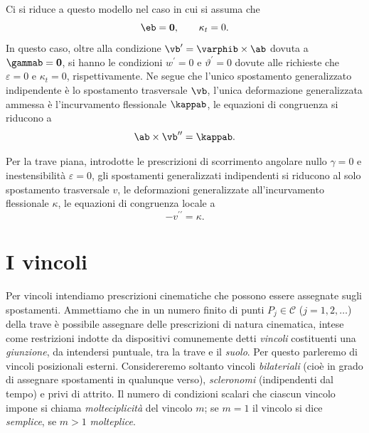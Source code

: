 Ci si riduce a questo modello nel caso in cui si assuma che
\begin{equation}
	\eb=\mathbf{0}, \qquad \kappa_t=0.
\end{equation}
In questo caso, oltre alla condizione $\vb^\prime = \varphib \times \ab$ dovuta a $\gammab = \mathbf{0}$, si hanno le condizioni $w^\prime = 0$ e $\vartheta^\prime = 0$ dovute alle richieste che $\varepsilon = 0$ e $\kappa_t = 0$, rispettivamente.
Ne segue che l'unico spostamento generalizzato indipendente è lo spostamento trasversale $\vb$, l'unica deformazione generalizzata ammessa è l'incurvamento flessionale $\kappab$, le equazioni di congruenza si riducono a
\begin{equation}
	\ab \times \vb^{\prime\prime} = \kappab.
\end{equation}



Per la trave piana, introdotte le prescrizioni  di scorrimento angolare nullo $\gamma = 0$ e inestensibilità $\varepsilon = 0$, gli spostamenti generalizzati indipendenti si riducono al solo spostamento trasversale $v$, le deformazioni generalizzate all'incurvamento flessionale $\kappa$, le equazioni di congruenza locale a
\begin{equation}
	-v^{\prime\prime} = \kappa.
\end{equation}


\section{I vincoli}\label{vincolicin}
Per vincoli intendiamo prescrizioni cinematiche  che possono essere assegnate  sugli spostamenti.
Ammettiamo che in un numero finito di punti  $P_j \in \mathcal{C}$ ($j = 1, 2, \ldots$)   della trave è  possibile assegnare delle prescrizioni di natura cinematica, intese come restrizioni indotte da dispositivi comunemente detti \textit{vincoli} costituenti una \emph{giunzione}, da intendersi puntuale, tra la trave e il \textit{suolo}. Per questo parleremo di vincoli posizionali esterni. Considereremo soltanto vincoli \textit{bilateriali} (cioè in grado di assegnare spostamenti in qualunque verso), \textit{scleronomi} (indipendenti dal tempo) e privi di attrito. Il  numero di condizioni scalari che ciascun vincolo impone si chiama \textit{molteciplicità} del vincolo $m$; se $m=1$ il vincolo si dice \textit{semplice}, se $m>1$ \textit{molteplice}.

